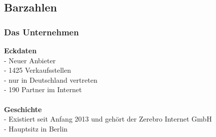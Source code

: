 \subsection{Barzahlen}
\subsubsection{Das Unternehmen}

\textbf{Eckdaten}\\
- Neuer Anbieter\\
- 1425 Verkaufsstellen\\
- nur in Deutschland vertreten\\
- 190 Partner im Internet\\
\\
%
%
\textbf{Geschichte}\\
- Existiert seit Anfang 2013 und gehört der Zerebro Internet GmbH\\
- Hauptsitz in Berlin\\

